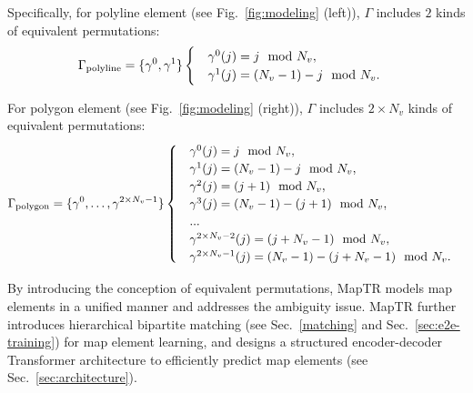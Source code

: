 \documentclass{article} \usepackage{iclr2023_conference,times}
\begin{document}
Specifically, for polyline element (see Fig.~\ref{fig:modeling} (left)),  $\Gamma$ includes $2$ kinds of equivalent permutations:
\begin{equation}
\begin{aligned}
&\Gamma_{\rm{polyline}} = \{\gamma^{0}, \gamma^{1} \}
\begin{cases}
&\gamma^{0}(j) = j \mod N_v,\\
&\gamma^{1}(j) = (N_v - 1) - j \mod N_v.\\
\end{cases}
\end{aligned}
\end{equation}

For polygon element (see Fig.~\ref{fig:modeling} (right)),  $\Gamma$ includes $2\times N_v$ kinds of equivalent permutations:
\begin{equation}
\begin{aligned}
&\Gamma_{\rm{polygon}} = \{\gamma^{0}, \dots, \gamma^{2 \times N_v-1}\}
\begin{cases}
&\gamma^{0}(j) = j \mod N_v,\\
&\gamma^{1}(j) = (N_v - 1) - j \mod N_v,\\
&\gamma^{2}(j) = (j + 1) \mod N_v,\\
&\gamma^{3}(j) = (N_v - 1) - (j + 1) \mod N_v,\\
&...\\
&\gamma^{2 \times N_v - 2}(j) = (j + N_v - 1) \mod N_v,\\
&\gamma^{2 \times N_v - 1}(j) = (N_v - 1) - (j + N_v - 1) \mod N_v.
\end{cases}
\end{aligned}
\end{equation}




By introducing the conception of equivalent permutations, MapTR models map elements in a unified manner and addresses the ambiguity issue. 
MapTR further introduces hierarchical bipartite matching (see Sec.~\ref{matching} and Sec.~\ref{sec:e2e-training}) for map element learning, and designs a structured encoder-decoder Transformer architecture to efficiently predict map elements (see  Sec.~\ref{sec:architecture}). 
\end{document}
